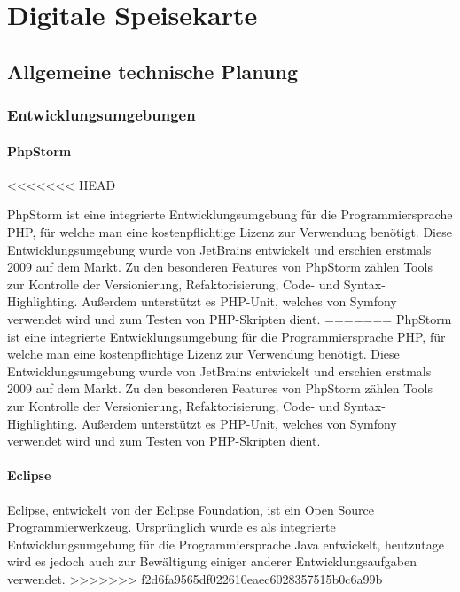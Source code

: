 \chapter{Digitale Speisekarte}
\renewcommand{\kapitelautor}{Autor: Katharina Joksch}

\section{Allgemeine technische Planung}

  \subsection{Entwicklungsumgebungen}

    \subsubsection{PhpStorm}
<<<<<<< HEAD

PhpStorm ist eine integrierte Entwicklungsumgebung für die Programmiersprache PHP, für welche man eine kostenpflichtige Lizenz zur Verwendung benötigt. Diese Entwicklungsumgebung wurde von JetBrains entwickelt und erschien erstmals 2009 auf dem Markt. Zu den besonderen Features von PhpStorm zählen Tools zur Kontrolle der Versionierung, Refaktorisierung, Code- und Syntax-Highlighting. Außerdem unterstützt es PHP-Unit, welches von Symfony verwendet wird und zum Testen von PHP-Skripten dient. 
=======
PhpStorm ist eine integrierte Entwicklungsumgebung für die Programmiersprache PHP, für welche man eine kostenpflichtige Lizenz zur Verwendung benötigt. Diese Entwicklungsumgebung wurde von JetBrains entwickelt und erschien erstmals 2009 auf dem Markt. Zu den besonderen Features von PhpStorm zählen Tools zur Kontrolle der Versionierung, Refaktorisierung, Code- und Syntax-Highlighting. Außerdem unterstützt es PHP-Unit, welches von Symfony verwendet wird und zum Testen von PHP-Skripten dient.

    \subsubsection{Eclipse}

Eclipse, entwickelt von der Eclipse Foundation, ist ein Open Source Programmierwerkzeug. Ursprünglich wurde es als integrierte Entwicklungsumgebung für die Programmiersprache Java entwickelt, heutzutage wird es jedoch auch zur Bewältigung einiger anderer Entwicklungsaufgaben verwendet.
>>>>>>> f2d6fa9565df022610eaec6028357515b0c6a99b

